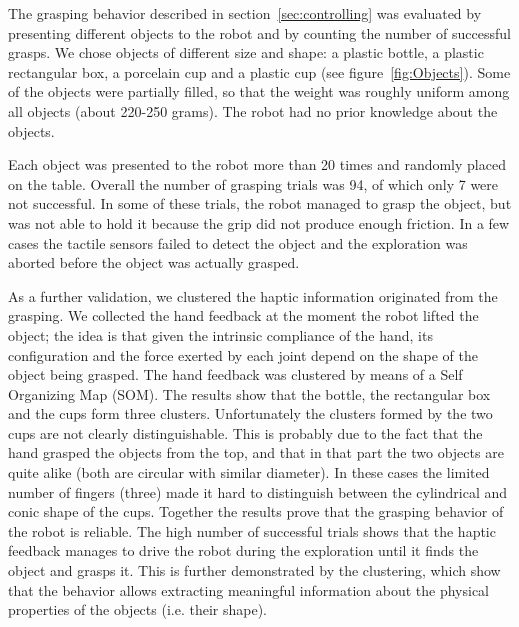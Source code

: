 
The grasping behavior described in section~\ref{sec:controlling}
was evaluated by presenting different objects to the robot and by
counting the number of successful grasps. We chose objects of
different size and shape: a plastic bottle, a plastic rectangular
box, a porcelain cup and a plastic cup (see
figure~\ref{fig:Objects}). Some of the objects were partially
filled, so that the weight was roughly uniform among all objects
(about 220-250 grams). The robot had no prior knowledge about the
objects.

Each object was presented to the robot more than 20 times and
randomly placed on the table. Overall the number of grasping
trials was 94, of which only 7 were not successful. In some of
these trials, the robot managed to grasp the object, but was not
able to hold it because the grip did not produce enough friction.
In a few cases the tactile sensors failed to detect the object and
the exploration was aborted before the object was actually
grasped.

As a further validation, we clustered the haptic information
originated from the grasping. We collected the hand feedback at
the moment the robot lifted the object; the idea is that given the
intrinsic compliance of the hand, its configuration and the force
exerted by each joint depend on the shape of the object being
grasped. The hand feedback was clustered by means of a Self
Organizing Map (SOM). The results show that the bottle, the
rectangular box and the cups form three clusters. Unfortunately
the clusters formed by the two cups are not clearly
distinguishable. This is probably due to the fact that the hand
grasped the objects from the top, and that in that part the two
objects are quite alike (both are circular with similar diameter).
In these cases the limited number of fingers (three) made it hard
to distinguish between the cylindrical and conic shape of the
cups. Together the results prove that the grasping behavior of the
robot is reliable. The high number of successful trials shows that
the haptic feedback manages to drive the robot during the
exploration until it finds the object and grasps it. This is
further demonstrated by the clustering, which show that the
behavior allows extracting meaningful information about the
physical properties of the objects (i.e. their shape).

